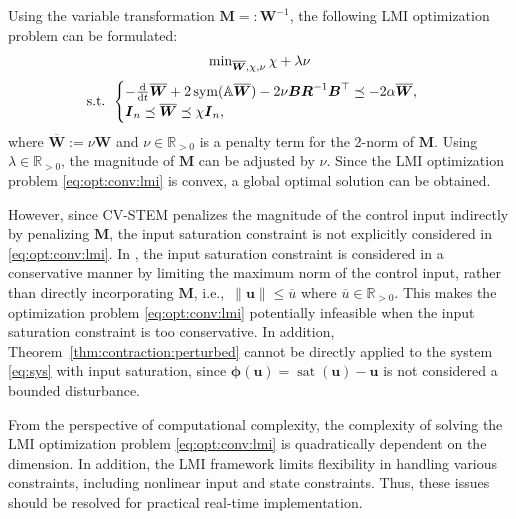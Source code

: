 \documentclass{ifacconf}
\newcommand\ie{\textrm{i.e.,\ }}
\newcommand\R{\mathbb{R}}
\newcommand*{\mv}[1]{\boldsymbol{#1}} %
\newcommand*{\mm}[1]{\boldsymbol{#1}} %
\newcommand*{\norm}[1]{\lVert #1 \rVert} %
\DeclareMathOperator{\mysat}{{sat}}       %
\DeclareMathOperator{\mysym}{{sym}}       %
\newcommand\der{\mathrm d}
\newcommand*{\ddtt}{
   \tfrac{\der}{\der t}
}
\begin{document}
Using the variable transformation $\mm{M}=:\mm{W}^{-1}$, the following LMI optimization problem can be formulated:
\begin{equation} \label{eq:opt:conv:lmi}
   \begin{matrix}
      \min_{
         \overline{\mm{W}},\chi,\nu
         } 
      \chi + \lambda \nu
      \\ 
      \vspace{-.2cm}
      \\
      \text{s.t. }
      \begin{cases}
         -
         \ddtt\overline{\mm{W}}
         +
         2\mysym(
            \mathbb{A}\overline{\mm{W}}
         )
         -
         2\nu\mm{B}\mm{R}^{-1} \mm{B}^\top 
         \preceq
         -2\alpha\overline{\mm{W}}
         ,
         \\
         \mm{I}_n
         \preceq
         \overline{\mm{W}}
         \preceq
         \chi \mm{I}_n
         ,
      \end{cases}
   \end{matrix}
\end{equation} 
where $\overline{\mm{W}}:=\nu\mm{W}$ and $\nu\in\R_{>0}$ is a penalty term for the 2-norm of $\mm{M}$.
Using $\lambda\in\R_{>0}$, the magnitude of $\mm{M}$ can be adjusted by $\nu$.
Since the LMI optimization problem \eqref{eq:opt:conv:lmi} is convex, a global optimal solution can be obtained.

However, since CV-STEM penalizes the magnitude of the control input indirectly by penalizing $\mm{M}$, the input saturation constraint is not explicitly considered in \eqref{eq:opt:conv:lmi}.
In \cite{Tsukamoto:2019aa}, the input saturation constraint is considered in a conservative manner by limiting the maximum norm of the control input, rather than directly incorporating $\mm{M}$, \ie $\norm{\mv{u}}\leq \overline{u}$ where $\overline{u}\in\R_{>0}$.
This makes the optimization problem \eqref{eq:opt:conv:lmi} potentially infeasible when the input saturation constraint is too conservative.
In addition, Theorem~\ref{thm:contraction:perturbed} cannot be directly applied to the system \eqref{eq:sys} with input saturation, since $\mv{\phi}(\mv{u})=\mysat(\mv{u})-\mv{u}$ is not considered a bounded disturbance.

From the perspective of computational complexity, the complexity of solving the LMI optimization problem \eqref{eq:opt:conv:lmi} is quadratically dependent on the dimension.
In addition, the LMI framework limits flexibility in handling various constraints, including nonlinear input and state constraints.
Thus, these issues should be resolved for practical real-time implementation.
\end{document}
